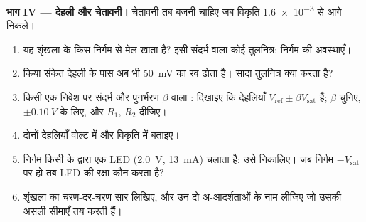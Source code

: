 \begin{problem}
\medskip
\noindent\textbf{भाग IV --- देहली और चेतावनी।}
चेतावनी तब बजनी चाहिए जब विकृति \num{1.6e-3} से आगे निकले।
\begin{enumerate}[resume]
  \item यह शृंखला के किस निर्गम  से मेल खाता है? इसी संदर्भ वाला
        कोई तुलनित्र: निर्गम की अवस्थाएँ।
  \item {} किया संकेत देहली के पास अब भी \qty{50}{mV} का रव ढोता है।
        सादा तुलनित्र क्या करता है?
  \item किसी एक निवेश पर संदर्भ और पुनर्भरण $\beta$ वाला :
        दिखाइए कि देहलियाँ $V_{\mathrm{ref}} \pm
        \beta V_{\mathrm{sat}}$ हैं; $\beta$ चुनिए, $\pm\qty{0.10}{V}$ के लिए,
        और $R_1$, $R_2$ दीजिए।
  \item दोनों देहलियाँ वोल्ट में और विकृति में बताइए।
  \item निर्गम किसी  के द्वारा एक LED (\qty{2.0}{V}, \qty{13}{mA})
        चलाता है: उसे निकालिए। जब निर्गम $-V_{\mathrm{sat}}$ पर हो तब
        LED की रक्षा कौन करता है?
  \item शृंखला का चरण-दर-चरण सार लिखिए, और उन दो अ-आदर्शताओं के नाम लीजिए
        जो उसकी असली सीमाएँ तय करती हैं।
\end{enumerate}
\end{problem}
